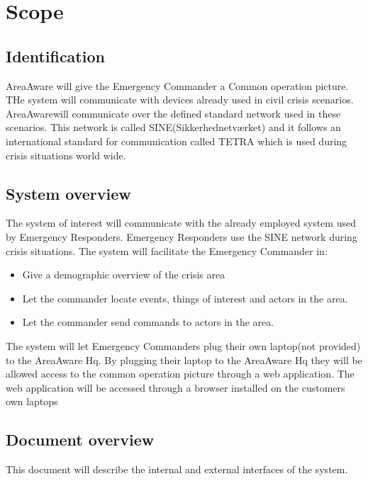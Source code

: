 \label{chp_scope}
\chapter{Scope}

\section{Identification}

AreaAware will give the Emergency Commander a Common operation picture. THe system will communicate with devices already used in civil crisis scenarios. AreaAwarewill communicate over the defined standard network used in these scenarios. This
network is called SINE(Sikkerhednetværket) and it follows an international standard for communication called TETRA which is used during crisis situations world wide.

\section{System overview}
The system of interest will communicate with the already employed system used by Emergency Responders. Emergency Responders use the SINE network during crisis situations. The system will facilitate the Emergency Commander in:

\begin{itemize}
	\item  Give a demographic overview of the crisis area
	\item Let the commander locate events, things of interest and actors in the area.
	\item Let the commander send commands to actors in the area.
\end{itemize}

The system will let Emergency Commanders plug their own laptop(not provided) to the AreaAware Hq. By plugging their laptop to the AreaAware Hq they will be allowed access to the common operation picture through a web application. The web application will be accessed through a browser installed on the customers own laptops


\section{Document overview}
This document will describe the internal and external interfaces of the system.
